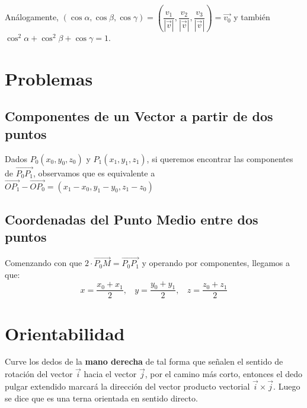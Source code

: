 \documentclass[11pt,a4paper]{article}
\begin{document}
\noindent An\'alogamente, $(\cos \alpha, \cos \beta, \cos \gamma) = \left(\dfrac{v_1}{|\overrightarrow{v}|}, \dfrac{v_2}{|\overrightarrow{v}|}, \dfrac{v_3}{|\overrightarrow{v}|}\right) = \overrightarrow{v_0}$ y tambi\'en $\cos^2\alpha+\cos^2\beta+\cos\gamma=1$.

\section{Problemas}
\subsection{Componentes de un Vector a partir de dos puntos}
\noindent Dados $P_0(x_0,y_0,z_0)$ y $P_1(x_1,y_1,z_1)$, si queremos encontrar las componentes de $\overrightarrow{P_0P_1}$, observamos que es equivalente a $\overrightarrow{OP_1}-\overrightarrow{OP_0} = (x_1-x_0, y_1-y_0, z_1-z_0)$
\subsection{Coordenadas del Punto Medio entre dos puntos}
\noindent Comenzando con que $2 \cdot \overrightarrow{P_0M} = \overrightarrow{P_0P_1}$ y operando por componentes, llegamos a que: $$x=\dfrac{x_0+x_1}{2},\ \ \ \ y=\dfrac{y_0+y_1}{2},\ \ \ \ z=\dfrac{z_0+z_1}{2}$$

\section{Orientabilidad}
\noindent Curve los dedos de la \textbf{mano derecha} de tal forma que señalen el sentido de rotación del vector $\overrightarrow{i}$ hacia el vector $\overrightarrow{j}$, por el camino más corto, entonces el dedo pulgar extendido marcará la dirección del vector producto vectorial $\overrightarrow{i}\times\overrightarrow{j}$. Luego se dice que es una terna orientada en sentido directo.
\end{document}
